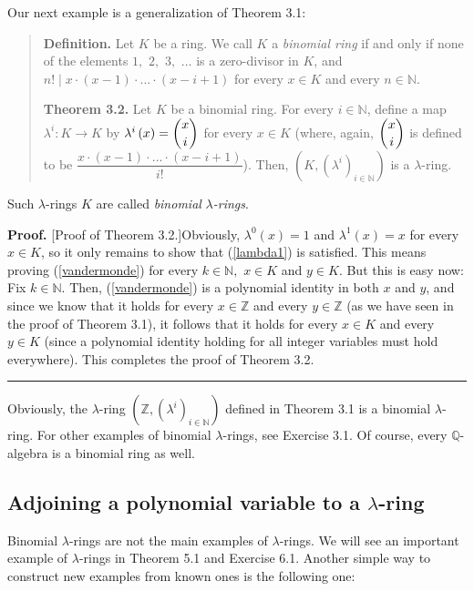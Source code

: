 \documentclass[numbers=enddot,12pt,final,onecolumn,notitlepage]{scrartcl}%
\newenvironment{proof}[1][Proof]{\noindent\textbf{#1.} }{\ \rule{0.5em}{0.5em}}
\begin{document}
Our next example is a generalization of Theorem 3.1:

\begin{quote}
\textbf{Definition.} Let $K$ be a ring. We call $K$ a \textit{binomial ring}
if and only if none of the elements $1,$ $2,$ $3,$ $...$ is a zero-divisor in
$K$, and $n!\mid x\cdot\left(  x-1\right)  \cdot...\cdot\left(  x-i+1\right)
$ for every $x\in K$ and every $n\in\mathbb{N}$.

\textbf{Theorem 3.2.} Let $K$ be a binomial ring. For every $i\in\mathbb{N}$,
define a map $\lambda^{i}:K\rightarrow K$ by $\lambda^{i}\left(  x\right)
=\dbinom{x}{i}$ for every $x\in K$ (where, again, $\dbinom{x}{i}$ is defined
to be $\dfrac{x\cdot\left(  x-1\right)  \cdot...\cdot\left(  x-i+1\right)
}{i!}$). Then, $\left(  K,\left(  \lambda^{i}\right)  _{i\in\mathbb{N}%
}\right)  $ is a $\lambda$-ring.
\end{quote}

Such $\lambda$-rings $K$ are called \textit{binomial }$\lambda$\textit{-rings}.

\begin{proof}
[Proof of Theorem 3.2.]Obviously, $\lambda^{0}\left(  x\right)  =1$ and
$\lambda^{1}\left(  x\right)  =x$ for every $x\in K$, so it only remains to
show that (\ref{lambda1}) is satisfied. This means proving (\ref{vandermonde})
for every $k\in\mathbb{N},$ $x\in K$ and $y\in K$. But this is easy now: Fix
$k\in\mathbb{N}$. Then, (\ref{vandermonde}) is a polynomial identity in both
$x$ and $y$, and since we know that it holds for every $x\in\mathbb{Z}$ and
every $y\in\mathbb{Z}$ (as we have seen in the proof of Theorem 3.1), it
follows that it holds for every $x\in K$ and every $y\in K$ (since a
polynomial identity holding for all integer variables must hold everywhere).
This completes the proof of Theorem 3.2.
\end{proof}

Obviously, the $\lambda$-ring $\left(  \mathbb{Z},\left(  \lambda^{i}\right)
_{i\in\mathbb{N}}\right)  $ defined in Theorem 3.1 is a binomial $\lambda
$-ring. For other examples of binomial $\lambda$-rings, see Exercise 3.1. Of
course, every $\mathbb{Q}$-algebra is a binomial ring as well.

\subsection{Adjoining a polynomial variable to a $\lambda$-ring}

Binomial $\lambda$-rings are not the main examples of $\lambda$-rings. We will
see an important example of $\lambda$-rings in Theorem 5.1 and Exercise 6.1.
Another simple way to construct new examples from known ones is the following one:
\end{document}
